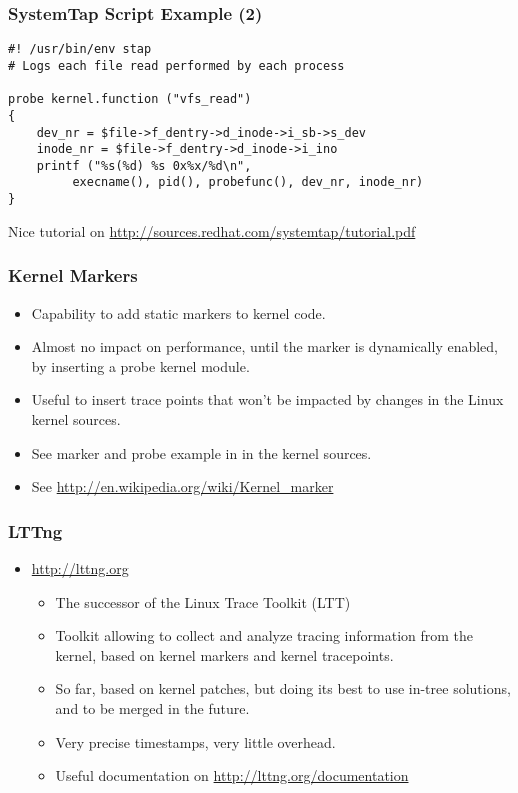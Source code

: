\begin{frame}[fragile]
  \frametitle{SystemTap Script Example (2)}
{\small
\begin{verbatim}
#! /usr/bin/env stap
# Logs each file read performed by each process

probe kernel.function ("vfs_read")
{
    dev_nr = $file->f_dentry->d_inode->i_sb->s_dev
    inode_nr = $file->f_dentry->d_inode->i_ino
    printf ("%s(%d) %s 0x%x/%d\n",
         execname(), pid(), probefunc(), dev_nr, inode_nr)
}
\end{verbatim}
}
Nice tutorial on \url{http://sources.redhat.com/systemtap/tutorial.pdf}
\end{frame}

\begin{frame}
  \frametitle{Kernel Markers}
  \begin{itemize}
  \item Capability to add static markers to kernel code.
  \item Almost no impact on performance, until the marker is
    dynamically enabled, by inserting a probe kernel module.
  \item Useful to insert trace points that won't be impacted by
    changes in the Linux kernel sources.
  \item See marker and probe example in  in the
    kernel sources.
  \item See \url{http://en.wikipedia.org/wiki/Kernel_marker}
  \end{itemize}
\end{frame}

\begin{frame}
  \frametitle{LTTng}
  \begin{itemize}
  \item \url{http://lttng.org}
    \begin{itemize}
    \item The successor of the Linux Trace Toolkit (LTT)
    \item Toolkit allowing to collect and analyze tracing information
      from the kernel, based on kernel markers and kernel tracepoints.
    \item So far, based on kernel patches, but doing its best to use
      in-tree solutions, and to be merged in the future.
    \item Very precise timestamps, very little overhead.
    \item Useful documentation on \url{http://lttng.org/documentation}
    \end{itemize}
  \end{itemize}
\end{frame}

